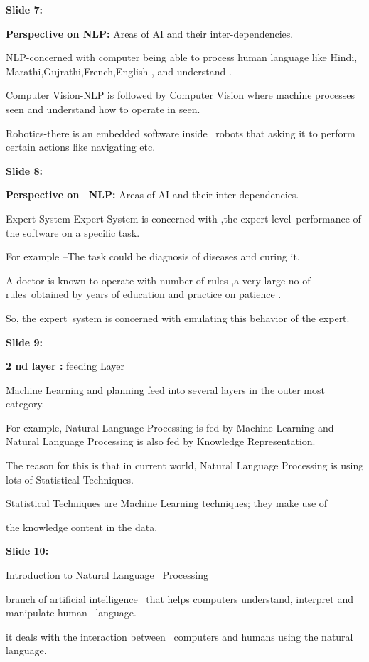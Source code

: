 \documentclass[11pt,a4paper]{article}
\begin{document}
\textbf{Slide 7:}

\textbf{Perspective on  NLP:} Areas of AI and their inter-dependencies.

NLP-concerned with computer being able to process human language like Hindi, Marathi,Gujrathi,French,English , and understand .

Computer Vision-NLP is followed by Computer Vision where machine processes seen and understand how to operate in seen.

Robotics-there is an embedded software inside  robots that asking it to perform certain actions like navigating etc.

\textbf{Slide 8:}

\textbf{Perspective on  NLP:} Areas of AI and their inter-dependencies.

Expert System-Expert System is concerned with ,the expert level performance of the software on a specific task.

For example –The task could be diagnosis of diseases and curing it.

A doctor is known to operate with number of rules ,a very large no of rules obtained by years of education and practice on patience .

So, the expert system is concerned with emulating this behavior of the expert.

\textbf{Slide 9:}

\textbf{2 nd layer :} feeding Layer

Machine Learning and planning feed into several layers in the outer most category.

For example, Natural Language Processing is fed by Machine Learning and Natural Language Processing is also fed by Knowledge Representation.

The reason for this is that in current world, Natural Language Processing is using lots of Statistical Techniques.

Statistical Techniques are Machine Learning techniques; they make use of

the knowledge content in the data.

\textbf{Slide 10:}

Introduction to Natural Language  Processing

branch of artificial intelligence  that helps computers understand, interpret and manipulate human  language.

it deals with the interaction between  computers and humans using the natural language.
\end{document}
